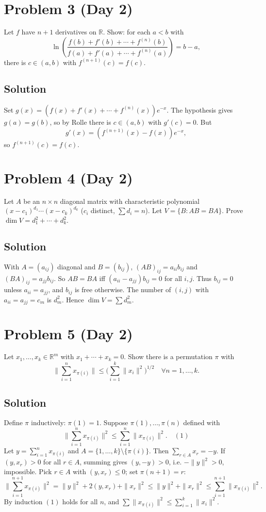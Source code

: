 \documentclass{article}
\begin{document}
\section*{Problem 3 (Day 2)}
Let $f$ have $n+1$ derivatives on $\mathbb{R}$. Show: for each $a < b$ with
\[
\ln\left(\frac{f(b) + f'(b) + \cdots + f^{(n)}(b)}{f(a) + f'(a) + \cdots + f^{(n)}(a)}\right) = b - a,
\]
there is $c \in (a,b)$ with $f^{(n+1)}(c) = f(c)$.

\subsection*{Solution}
Set $g(x) = (f(x) + f'(x) + \cdots + f^{(n)}(x))e^{-x}$. The hypothesis gives $g(a) = g(b)$, so by Rolle there is $c \in (a,b)$ with $g'(c) = 0$. But
\[
g'(x) = (f^{(n+1)}(x) - f(x))e^{-x},
\]
so $f^{(n+1)}(c) = f(c)$.

\section*{Problem 4 (Day 2)}
Let $A$ be an $n\times n$ diagonal matrix with characteristic polynomial $(x-c_1)^{d_1}\cdots(x-c_k)^{d_k}$ ($c_i$ distinct, $\sum d_i = n$). Let $V = \{B : AB = BA\}$. Prove $\dim V = d_1^2 + \cdots + d_k^2$.

\subsection*{Solution}
With $A = (a_{ij})$ diagonal and $B = (b_{ij})$, $(AB)_{ij} = a_{ii} b_{ij}$ and $(BA)_{ij} = a_{jj} b_{ij}$. So $AB = BA$ iff $(a_{ii} - a_{jj})b_{ij} = 0$ for all $i,j$. Thus $b_{ij} = 0$ unless $a_{ii} = a_{jj}$, and $b_{ij}$ is free otherwise. The number of $(i,j)$ with $a_{ii} = a_{jj} = c_m$ is $d_m^2$. Hence $\dim V = \sum d_m^2$.

\section*{Problem 5 (Day 2)}
Let $x_1, \ldots, x_k \in \mathbb{R}^m$ with $x_1 + \cdots + x_k = 0$. Show there is a permutation $\pi$ with
\[
\Big\|\sum_{i=1}^n x_{\pi(i)}\Big\| \leq \Big(\sum_{i=1}^k \|x_i\|^2\Big)^{1/2} \quad \forall n = 1, \ldots, k.
\]

\subsection*{Solution}
Define $\pi$ inductively: $\pi(1) = 1$. Suppose $\pi(1), \ldots, \pi(n)$ defined with
\[
\Big\|\sum_{i=1}^n x_{\pi(i)}\Big\|^2 \leq \sum_{i=1}^n \|x_{\pi(i)}\|^2. \quad (1)
\]
Let $y = \sum_{i=1}^n x_{\pi(i)}$ and $A = \{1,\ldots,k\}\setminus\{\pi(i)\}$. Then $\sum_{r\in A} x_r = -y$. If $(y, x_r) > 0$ for all $r \in A$, summing gives $(y, -y) > 0$, i.e. $-\|y\|^2 > 0$, impossible. Pick $r \in A$ with $(y, x_r) \leq 0$; set $\pi(n+1) = r$:
\[
\Big\|\sum_{i=1}^{n+1} x_{\pi(i)}\Big\|^2 = \|y\|^2 + 2(y, x_r) + \|x_r\|^2 \leq \|y\|^2 + \|x_r\|^2 \leq \sum_{i=1}^{n+1} \|x_{\pi(i)}\|^2.
\]
By induction $(1)$ holds for all $n$, and $\sum \|x_{\pi(i)}\|^2 \leq \sum_{i=1}^k \|x_i\|^2$.
\end{document}
